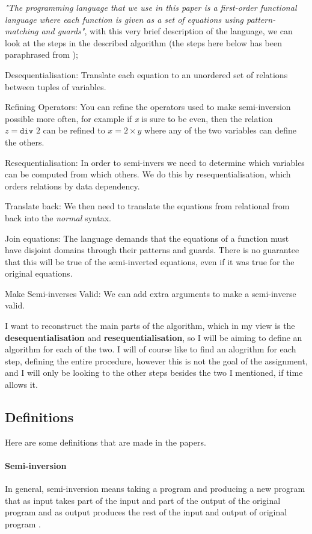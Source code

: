 \textit{"The programming language that we use in this paper is a first-order functional language where each function is given as a set of equations using pattern-matching and guards"}\cite{Guarded}, with this very brief description of the language, we can look at the steps in the described algorithm (the steps here below has been paraphrased from \cite{Guarded});
\begin{description}
\item{Desequentialisation:} Translate each equation to an unordered set of relations between tuples of variables.
\item{Refining Operators:} You can refine the operators used to make semi-inversion possible more often, for example if \textit{x} is sure to be even, then the relation $z = \texttt{div }2$ can be refined to $x=2\times y$ where any of the two variables can define the others.
\item{Resequentialisation:} In order to semi-invers we need to determine which variables can be computed from which others. We do this by resequentialisation, which orders relations by data dependency. 
\item{Translate back:} We then need to translate the equations from relational from back into the \textit{normal} syntax.
\item{Join equations:} The language demands that the equations of a function must have disjoint domains through their patterns and guards. There is no guarantee that this will be true of the semi-inverted equations, even if it was true for the original equations.
\item{Make Semi-inverses Valid:} We can add extra arguments to make a semi-inverse valid.
\end{description}
I want to reconstruct the main parts of the algorithm, which in my view is the \textbf{desequentialisation} and \textbf{resequentialisation}, so I will be aiming to define an algorithm for each of the two. I will of course like to find an alogrithm for each step, defining the entire procedure, however this is not the goal of the assignment, and I will only be looking to the other steps besides the two I mentioned, if time allows it.

\subsection{Definitions}
Here are some definitions that are made in the papers.
\paragraph{Semi-inversion} In general, semi-inversion means taking a program and producing a new program that as input takes part of the input and part of the output of the original program and as output produces the rest of the input and output of original program \cite{Guarded}.

